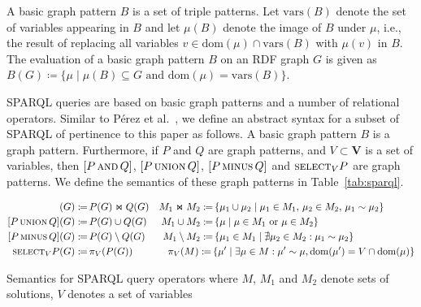 \documentclass{llncs}
\newcommand{\V}{\ensuremath{\mathbf{V}}\xspace}
\newcommand{\ssyn}[3]{[\ensuremath{#1\,\textsc{#2}\,#3}]}
\newcommand{\sand}[2]{\ssyn{#1}{and}{#2}}
\newcommand{\suni}[2]{\ssyn{#1}{union}{#2}}
\newcommand{\sminus}[2]{\ssyn{#1}{minus}{#2}}
\newcommand{\ssel}[2]{\ensuremath{\textsc{select}_{#2}#1}}
\newcommand{\dom}[1]{\ensuremath{\mathrm{dom}(#1)}}
\newcommand{\vars}[1]{\ensuremath{\mathrm{vars}(#1)}}
\newcommand{\com}[2]{\ensuremath{#1 \sim #2}}
\def\ojoin{\setbox0=\hbox{$\bowtie$}%
	\rule[0.18ex]{.25em}{.5pt}\llap{\rule[.9ex]{.25em}{.5pt}}}
\def\loj{\mathbin{\ojoin\mkern-5.8mu\bowtie}}
\newcommand{\da}{\ensuremath{:\nolinebreak\mkern-1.2mu\nolinebreak=}}
\begin{document}
A basic graph pattern $B$ is a set of triple patterns. Let $\vars{B}$ denote the set of variables appearing in $B$ and let $\mu(B)$ denote the image of $B$ under $\mu$, i.e., the result of replacing all variables $v \in \dom{\mu} \cap \vars{B}$ with $\mu(v)$ in $B$. The evaluation of a basic graph pattern $B$ on an RDF graph $G$ is given as $B(G) \coloneqq \{ \mu \mid \mu(B) \subseteq G\text{ and }\dom{\mu} = \vars{B} \}$.

SPARQL queries are based on basic graph patterns and a number of relational operators. Similar to Pérez et al.~\cite{PerezAG09}, we define an abstract syntax for a subset of SPARQL of pertinence to this paper as follows. A basic graph pattern $B$ is a graph pattern. Furthermore, if $P$ and $Q$ are graph patterns, and $V \subset \V$ is a set of variables, then $\sand{P}{Q}$, $\suni{P}{Q}$, $\sminus{P}{Q}$ and $\ssel{P}{V}$ are graph patterns. We define the semantics of these graph patterns in Table~\ref{tab:sparql}.

\begin{table}[t]
{\scriptsize
\begin{align*}
\sand{P}{Q}(G) \da &\, P(G) \Join Q(G) & M_1 \Join M_2 \da &\, \{ \mu_1 \cup \mu_2 \mid \mu_1 \in M_1,\, \mu_2 \in M_2,\, \com{\mu_1}{\mu_2} \} \\
\suni{P}{Q}(G) \da &\, P(G) \cup Q(G) & M_1 \cup M_2 \da &\, \{ \mu \mid \mu \in M_1\text{ or }\mu \in M_2 \} \\
\sminus{P}{Q}(G) \da &\, P(G) \setminus Q(G) &  M_1 \setminus M_2 \da &\, \{ \mu_1 \in M_1 \mid \nexists \mu_2 \in M_2 : \com{\mu_1}{\mu_2} \} \\
\ssel{P}{V}(G) \da &\, \pi_V(P(G)) & \pi_V(M) \da\,& \{ \mu' \mid \exists \mu \in M : \mu' \sim \mu, \dom{\mu'} = V \cap \dom{\mu} \}
\end{align*}}
\caption{Semantics for SPARQL query operators where $M$, $M_1$ and $M_2$ denote sets of solutions, $V$ denotes a set of variables\label{tab:sparql}}
\end{table}
\end{document}
